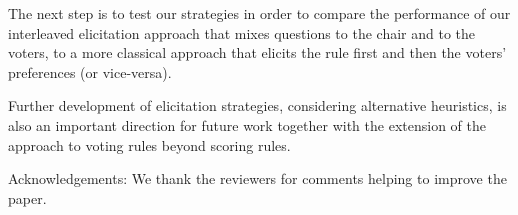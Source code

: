 \documentclass[a4paper,twoside]{article}
\begin{document}
The next step is to test our strategies in order to compare the performance of our interleaved elicitation approach that mixes questions to the chair and to the voters, to a more classical approach that elicits the rule first and then the voters' preferences (or vice-versa). 

Further development of elicitation strategies, considering alternative heuristics, is also an important direction for future work together with the extension of the approach to voting rules beyond scoring rules.
\bigskip

Acknowledgements: We thank the reviewers for comments helping to improve the paper. 


% 
\end{document}
